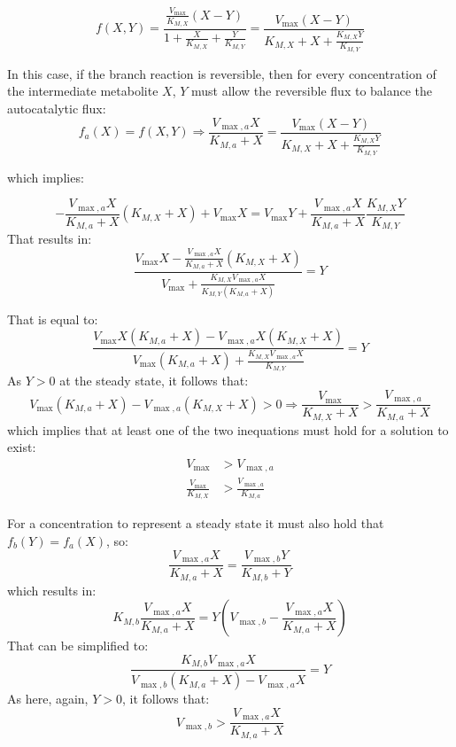\begin{equation*}
  f(X,Y)=\frac{\frac{V_{\max}}{K_{M,X}}(X-Y)}{1+\frac{X}{K_{M,X}}+\frac{Y}{K_{M,Y}}} = \frac{V_{\max}(X-Y)}{K_{M,X}+X+\frac{K_{M,X}Y}{K_{M,Y}}} 
\end{equation*}

In this case, if the branch reaction is reversible, then for every concentration of the intermediate metabolite $X$, $Y$ must allow the reversible flux to balance the autocatalytic flux:
\begin{equation*}
  f_a(X)=f(X,Y)\Rightarrow \frac{V_{\max,a}X}{K_{M,a}+X}=\frac{V_{\max}(X-Y)}{K_{M,X}+X+\frac{K_{M,X}Y}{K_{M,Y}}}
\end{equation*}

which implies:

\begin{equation*}
  -\frac{V_{\max,a}X}{K_{M,a}+X}(K_{M,X}+X)+V_{\max}X=V_{\max}Y+\frac{V_{\max,a}X}{K_{M,a}+X}\frac{K_{M,X}Y}{K_{M,Y}}
\end{equation*}
That results in:
\begin{equation*}
  \frac{V_{\max}X-\frac{V_{\max,a}X}{K_{M,a}+X}(K_{M,X}+X)}{V_{\max}+\frac{K_{M,X}V_{\max,a}X}{K_{M,Y}(K_{M,a}+X)}}=Y
\end{equation*}

That is equal to:
\begin{equation*}
  \frac{V_{\max}X(K_{M,a}+X)-V_{\max,a}X(K_{M,X}+X)}{V_{\max}(K_{M,a}+X)+\frac{K_{M,X}V_{\max,a}X}{K_{M,Y}}}=Y
\end{equation*}
As $Y>0$ at the steady state, it follows that:
\begin{equation*}
  V_{\max}(K_{M,a}+X)-V_{\max,a}(K_{M,X}+X)>0 \Rightarrow \frac{V_{\max}}{K_{M,X}+X}>\frac{V_{\max,a}}{K_{M,a}+X}
\end{equation*}
which implies that at least one of the two inequations must hold for a solution to exist:
\begin{align*}
  V_{\max} &> V_{\max,a} \\
  \frac{V_{\max}}{K_{M,X}} &>\frac{V_{\max,a}}{K_{M,a}}
\end{align*}


For a concentration to represent a steady state it must also hold that $f_b(Y)=f_a(X)$, so:
\begin{equation*}
    \frac{V_{\max,a}X}{K_{M,a}+X}=\frac{V_{\max,b}Y}{K_{M,b}+Y}
\end{equation*}
which results in:
\begin{equation*}
    K_{M,b}\frac{V_{\max,a}X}{K_{M,a}+X}=Y(V_{\max,b}-\frac{V_{\max,a}X}{K_{M,a}+X})
\end{equation*}
That can be simplified to:
\begin{equation*}
    \frac{K_{M,b}V_{\max,a}X}{V_{\max,b}(K_{M,a}+X)-V_{\max,a}X}=Y
\end{equation*}
As here, again, $Y>0$, it follows that:
\begin{equation*}
  V_{\max,b}>\frac{V_{\max,a}X}{K_{M,a}+X}
\end{equation*}


